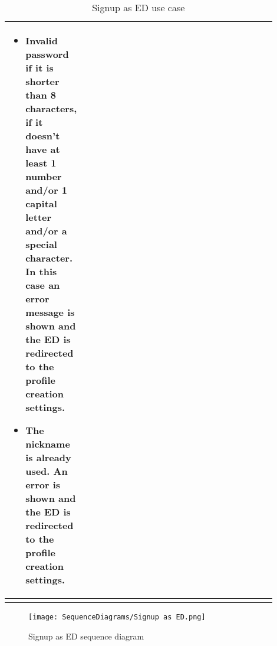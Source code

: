 \begin{center}
\begin{longtable}{|l|p{0.9\linewidth}|}
\begin{itemize}
            \item Invalid password if it is shorter than 8 characters, if it doesn’t have at least 1 number and/or 1 capital letter and/or a special character. In this case an error message is shown and the ED is redirected to the profile creation settings.
            \item  The nickname is already used. An error is shown and the ED is redirected to the profile creation settings.
        \end{itemize}  \\
        \hline
        \caption{Signup as ED use case}
        \label{tab: signup_as_ED_use_case}
    \end{longtable}
\end{center}

\begin{figure}[H]
    \begin{center}
        \texttt{[image: SequenceDiagrams/Signup as ED.png]}
        \caption{Signup as ED sequence diagram}
        \label{fig:signup_as_ED_seqd}%
    \end{center}
\end{figure}


